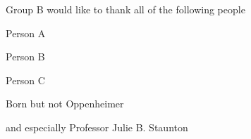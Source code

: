 Group B would like to thank all of the following people


\begin{DoxyItemize}
\item Person A
\item Person B
\item Person C
\item Born but not Oppenheimer
\end{DoxyItemize}

and especially Professor Julie B. Staunton

 